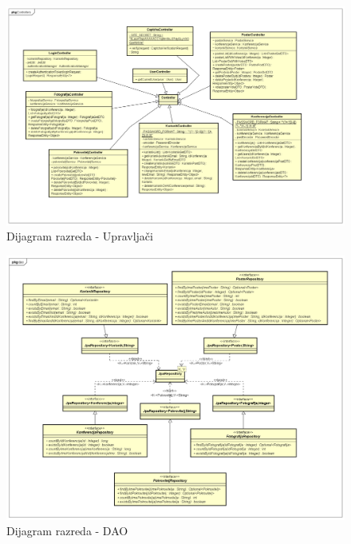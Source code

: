 			\begin{figure} [hbt!]
				\includegraphics[width=\linewidth]{Slike/Controllers}
				\caption{Dijagram razreda - Upravljači}
			\end{figure}
			
			\begin{figure} [hbt!]
				\includegraphics[width=\linewidth]{Slike/ClassDiagramDAORevised}
				\caption{Dijagram razreda - DAO}
			\end{figure}
			
